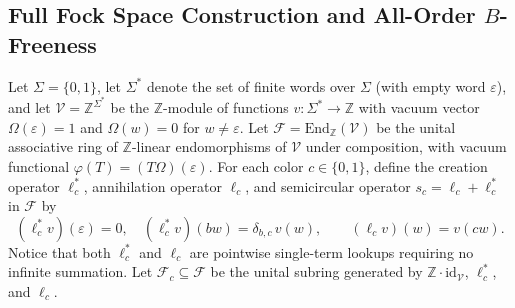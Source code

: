 \documentclass[11pt,a4paper]{article}
\theoremstyle{definition}
\newcommand{\id}{\mathrm{id}}
\begin{document}
\subsection{Full Fock Space Construction and All-Order \texorpdfstring{$B$}{B}-Freeness}
Let $\Sigma = \{0, 1\}$, let $\Sigma^*$ denote the set of finite words over $\Sigma$ (with empty word $\varepsilon$), and let $\mathcal{V} = \mathbb{Z}^{\Sigma^*}$ be the $\mathbb{Z}$-module of functions $v \colon \Sigma^* \to \mathbb{Z}$ with vacuum vector $\Omega(\varepsilon) = 1$ and $\Omega(w) = 0$ for $w \neq \varepsilon$. Let $\mathcal{F} = \mathrm{End}_{\mathbb{Z}}(\mathcal{V})$ be the unital associative ring of $\mathbb{Z}$-linear endomorphisms of $\mathcal{V}$ under composition, with vacuum functional $\varphi(T) = (T\Omega)(\varepsilon)$. For each color $c \in \{0, 1\}$, define the creation operator $\ell_c^*$, annihilation operator $\ell_c$, and semicircular operator $s_c = \ell_c + \ell_c^*$ in $\mathcal{F}$ by
\[
(\ell_c^* v)(\varepsilon) = 0, \quad (\ell_c^* v)(b w) = \delta_{b,c}\, v(w), \qquad (\ell_c v)(w) = v(c w).
\]
Notice that both $\ell_c^*$ and $\ell_c$ are pointwise single-term lookups requiring no infinite summation. Let $\mathcal{F}_c \subseteq \mathcal{F}$ be the unital subring generated by $\mathbb{Z}\cdot \id_{\mathcal{V}}$, $\ell_c^*$, and $\ell_c$.
\end{document}

